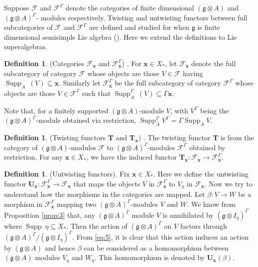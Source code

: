 \documentclass[11pt]{amsart}
\theoremstyle{plain}
\theoremstyle{definition}
\newtheorem{defn}[thm]{Definition}
\newcommand{\g}{\mathfrak{g}}
\DeclareMathOperator{\Supp}{Supp}
\begin{document}
Suppose $\mathcal{F}$ and $\mathcal{F}^{\Gamma}$ denote the categories of finite dimensional $(\g\otimes A)$ and $(\g\otimes A)^{\Gamma}$- modules respectively. 
Twisting and untwisting functors between full subcategories of $\mathcal{F}$ and $\mathcal{F}^{\Gamma}$ are defined and studied for when $\g$ is finite dimensional semisimple Lie algebra (\cite{FKKS12, FMS15}). Here we extend the definitions to Lie superalgebras. 

\begin{defn}(Categories $\mathcal{F}_{\mathbf{x}}$ and $\mathcal{F}_{\mathbf{x}}^{\Gamma}$) \label{def:14}.
       For $\mathbf{x}\in X_{*}$, let $\mathcal{F}_{\mathbf{x}}$ denote the full subcategory of category $\mathcal{F}$ whose objects are those $V \in \mathcal{F}$ having $\Supp_{A}\ (V)\subseteq\mathbf{x}$. Similarly let $\mathcal{F}_{\mathbf{x}}^{\Gamma}$ be the full subcategory of category $\mathcal{F}^{\Gamma}$ whose objects are those $V \in \mathcal{F}^{\Gamma}$ such that $\Supp_{A}^{\Gamma}\ (V)\subseteq\Gamma\mathbf{x}$.
\end{defn}
 Note that, for a finitely supported 
 $(\g\otimes A)$-module $V$, with $V^{\Gamma}$ being the $(\g\otimes A)^{\Gamma}$-module obtained via restriction, $\Supp^{\Gamma}_{A}V^{\Gamma}=\Gamma \Supp_{A}V$.
\begin{defn}(Twisting functors $\mathbf{T}$ and $\mathbf{T}_{\mathbf{x}})$ \label{def:15}.
The twisting functor $\mathbf{T}$ is from the category of $(\g\otimes A)$-modules $\mathcal{F}$ to $(\g\otimes A)^{\Gamma}$-modules $\mathcal{F}^{\Gamma}$ obtained by restriction. For any $\mathbf{x}\in X_{*}$, we have the induced functor $\mathbf{T}_{\mathbf{x}}:\mathcal{F}_{\mathbf{x}}\rightarrow\mathcal{F}_{\mathbf{x}}^{\Gamma}$.
\end{defn}
\begin{defn}(Untwisting functors)\label{def:16}.
Fix $\mathbf{x}\in X_{*}$. Here we define the untwisting functor $\mathbf{U}_{\mathbf{x}}:\mathcal{F}^{\Gamma}_{\mathbf{x}}\rightarrow\mathcal{F}_{\mathbf{x}}$ that maps the objects $V$ in $\mathcal{F}^{\Gamma}_{\mathbf{x}}$ to $V_{\eta}$ in $\mathcal{F}_{\mathbf{x}}$. Now we try to understand how the morphisms in the categories are mapped. Let $\beta:V\rightarrow W$ be a morphism in $\mathcal{F}^{\Gamma}_{\mathbf{x}}$ mapping two $(\g\otimes A)^{\Gamma}$-modules $V$ and $W$. We know from Proposition \ref{prop:3} that, any $(\g\otimes A)^{\Gamma}$ module $V$ is annihilated by $(\g\otimes I_{\eta})^{\Gamma}$ where $\Supp~\eta\subseteq X_{*}$. Then the action of $(\g\otimes A)^{\Gamma}$ on $V$ factors through $(\g\otimes A)^{\Gamma}/(\g\otimes I_{\eta})^{\Gamma}$. From \eqref{eq:5}, it is clear that this action induces an action by $(\g\otimes A)$ and hence $\beta$ can be considered as a homomorphism between $(\g\otimes A)$ modules $V_{\eta}$ and $W_{\eta}$. This homomorphism is denoted by $\mathbf{U}_{\mathbf{x}}(\beta)$.
\end{defn}
\end{document}

